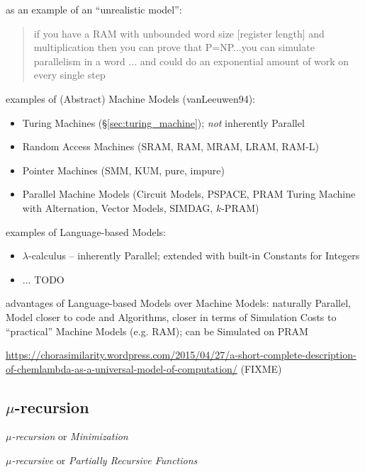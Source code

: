 as an example of an ``unrealistic model'':
\begin{quote}
if you have a RAM with unbounded word size [register length] and multiplication
then you can prove that P=NP...you can simulate parallelism in a word ... and
could do an exponential amount of work on every single step
\end{quote}

examples of (Abstract) Machine Models (vanLeeuwen94):
\begin{itemize}
  \item Turing Machines (\S\ref{sec:turing_machine}); \emph{not} inherently
    Parallel
  \item Random Access Machines (SRAM, RAM, MRAM, LRAM, RAM-L)
  \item Pointer Machines (SMM, KUM, pure, impure)
  \item Parallel Machine Models (Circuit Models, PSPACE, PRAM Turing Machine
    with Alternation, Vector Models, SIMDAG, $k$-PRAM)
\end{itemize}

examples of Language-based Models:
\begin{itemize}
  \item $\lambda$-calculus -- inherently Parallel; extended with built-in
    Constants for Integers
  \item ... TODO
\end{itemize}

advantages of Language-based Models over Machine Models: naturally Parallel,
Model closer to code and Algorithms, closer in terms of Simulation Costs to
``practical'' Machine Models (e.g. RAM); can be Simulated on PRAM

\asterism

\url{https://chorasimilarity.wordpress.com/2015/04/27/a-short-complete-description-of-chemlambda-as-a-universal-model-of-computation/}
(FIXME)



\subsection{$\mu$-recursion}\label{sec:mu_recursion}

\emph{$\mu$-recursion} or \emph{Minimization}

\emph{$\mu$-recursive} or \emph{Partially Recursive Functions}

